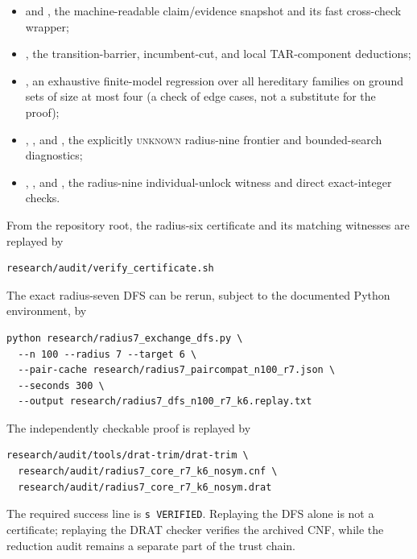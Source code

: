 \documentclass[11pt]{article}
\theoremstyle{definition}
\theoremstyle{remark}
\begin{document}
\begin{itemize}[leftmargin=*]
  checksum, witness, differential-test, rebuild, and decisive replay wrapper;
  \item {} and
  , the machine-readable
  claim/evidence snapshot and its fast cross-check wrapper;
  \item {}, the transition-barrier,
  incumbent-cut, and local TAR-component deductions;
  \item {}, an exhaustive
  finite-model regression over all hereditary families on ground sets of size
  at most four (a check of edge cases, not a substitute for the proof);
  \item {},
  , and
  , the explicitly
  \textsc{unknown} radius-nine frontier and bounded-search diagnostics;
  \item {},
  , and
  , the radius-nine
  individual-unlock witness and direct exact-integer checks.
\end{itemize}

From the repository root, the radius-six certificate and its matching
witnesses are replayed by
\begin{verbatim}
research/audit/verify_certificate.sh
\end{verbatim}
The exact radius-seven DFS can be rerun, subject to the documented Python
environment, by
\begin{verbatim}
python research/radius7_exchange_dfs.py \
  --n 100 --radius 7 --target 6 \
  --pair-cache research/radius7_paircompat_n100_r7.json \
  --seconds 300 \
  --output research/radius7_dfs_n100_r7_k6.replay.txt
\end{verbatim}
The independently checkable proof is replayed by
\begin{verbatim}
research/audit/tools/drat-trim/drat-trim \
  research/audit/radius7_core_r7_k6_nosym.cnf \
  research/audit/radius7_core_r7_k6_nosym.drat
\end{verbatim}
The required success line is \texttt{s VERIFIED}.  Replaying the DFS alone is
not a certificate; replaying the DRAT checker verifies the archived CNF, while
the reduction audit remains a separate part of the trust chain.
\end{document}
